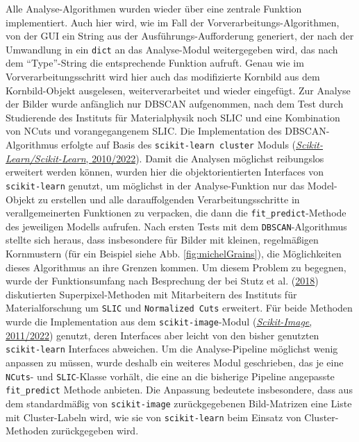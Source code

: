 \documentclass[
  12pt,
  openany]{book}
\begin{document}
Alle Analyse-Algorithmen wurden wieder über eine zentrale Funktion implementiert. Auch hier wird, wie im Fall der Vorverarbeitungs-Algorithmen, von der GUI ein String aus der Ausführungs-Aufforderung generiert, der nach der Umwandlung in ein \texttt{dict} an das Analyse-Modul weitergegeben wird, das nach dem ``Type''-String die entsprechende Funktion aufruft. Genau wie im Vorverarbeitungsschritt wird hier auch das modifizierte Kornbild aus dem Kornbild-Objekt ausgelesen, weiterverarbeitet und wieder eingefügt.
Zur Analyse der Bilder wurde anfänglich nur DBSCAN aufgenommen, nach dem Test durch Studierende des Instituts für Materialphysik noch SLIC und eine Kombination von NCuts und vorangegangenem SLIC.
Die Implementation des DBSCAN-Algorithmus erfolgte auf Basis des \texttt{scikit-learn\ cluster} Moduls (\protect\hyperlink{ref-ScikitlearnScikitlearn2022}{\emph{Scikit-Learn/Scikit-Learn}, 2010/2022}). Damit die Analysen möglichst reibungslos erweitert werden können, wurden hier die objektorientierten Interfaces von \texttt{scikit-learn} genutzt, um möglichst in der Analyse-Funktion nur das Model-Objekt zu erstellen und alle darauffolgenden Verarbeitungsschritte in verallgemeinerten Funktionen zu verpacken, die dann die \texttt{fit\_predict}-Methode des jeweiligen Modells aufrufen.
Nach ersten Tests mit dem \texttt{DBSCAN}-Algorithmus stellte sich heraus, dass insbesondere für Bilder mit kleinen, regelmäßigen Kornmustern (für ein Beispiel siehe Abb. \ref{fig:michelGrains}), die Möglichkeiten dieses Algorithmus an ihre Grenzen kommen. Um diesem Problem zu begegnen, wurde der Funktionsumfang nach Besprechung der bei Stutz et al. (\protect\hyperlink{ref-stutzSuperpixelsEvaluationStateoftheart2018}{2018}) diskutierten Superpixel-Methoden mit Mitarbeitern des Instituts für Materialforschung um \texttt{SLIC} und \texttt{Normalized\ Cuts} erweitert. Für beide Methoden wurde die Implementation aus dem \texttt{scikit-image}-Modul (\protect\hyperlink{ref-ScikitimageImageProcessing2022}{\emph{Scikit-Image}, 2011/2022}) genutzt, deren Interfaces aber leicht von den bisher genutzten \texttt{scikit-learn} Interfaces abweichen. Um die Analyse-Pipeline möglichst wenig anpassen zu müssen, wurde deshalb ein weiteres Modul geschrieben, das je eine \texttt{NCuts}- und \texttt{SLIC}-Klasse vorhält, die eine an die bisherige Pipeline angepasste \texttt{fit\_predict} Methode anbieten. Die Anpassung bedeutete insbesondere, dass aus dem standardmäßig von \texttt{scikit-image} zurückgegebenen Bild-Matrizen eine Liste mit Cluster-Labeln wird, wie sie von \texttt{scikit-learn} beim Einsatz von Cluster-Methoden zurückgegeben wird.
\end{document}

